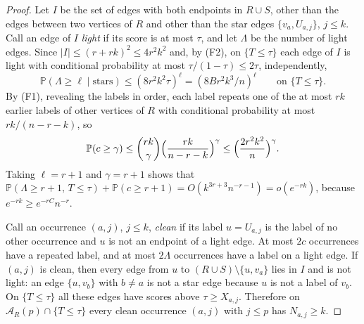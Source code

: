 \documentclass[11pt]{amsart}
\theoremstyle{remark}
\numberwithin{equation}{section}
\newcommand{\Pp}{\mathbb P}
\newcommand{\1}{\mathbf 1}
\begin{document}
\begin{proof}
Let $I$ be the set of edges with both endpoints in $R\cup S$, other than the edges between two vertices of $R$ and other than the star edges $\{v_a,U_{a,j}\}$, $j\le k$. Call an edge of $I$ \emph{light} if its score is at most $\tau$, and let $\Lambda$ be the number of light edges. Since $|I|\le(r+rk)^2\le4r^2k^2$ and, by (F2), on $\{T\le\tau\}$ each edge of $I$ is light with conditional probability at most $\tau/(1-\tau)\le2\tau$, independently,
\begin{equation}\label{eq:light}
\Pp(\Lambda\ge\ell\mid\text{stars})\le(8r^2k^2\tau)^\ell=(8Br^2k^3/n)^\ell\qquad\text{on }\{T\le\tau\}.
\end{equation}
By (F1), revealing the labels in order, each label repeats one of the at most $rk$ earlier labels of other vertices of $R$ with conditional probability at most $rk/(n-r-k)$, so
\begin{equation}\label{eq:coll}
\Pp(c\ge\gamma)\le\binom{rk}\gamma\Bigl(\frac{rk}{n-r-k}\Bigr)^\gamma\le\Bigl(\frac{2r^2k^2}n\Bigr)^\gamma .
\end{equation}
Taking $\ell=r+1$ and $\gamma=r+1$ shows that $\Pp(\Lambda\ge r+1,\,T\le\tau)+\Pp(c\ge r+1)=O(k^{3r+3}n^{-r-1})=o(e^{-rk})$, because $e^{-rk}\ge e^{-rC}n^{-r}$.

Call an occurrence $(a,j)$, $j\le k$, \emph{clean} if its label $u=U_{a,j}$ is the label of no other occurrence and $u$ is not an endpoint of a light edge. At most $2c$ occurrences have a repeated label, and at most $2\Lambda$ occurrences have a label on a light edge. If $(a,j)$ is clean, then every edge from $u$ to $(R\cup S)\setminus\{u,v_a\}$ lies in $I$ and is not light: an edge $\{u,v_b\}$ with $b\ne a$ is not a star edge because $u$ is not a label of $v_b$. On $\{T\le\tau\}$ all these edges have scores above $\tau\ge X_{a,j}$. Therefore on $\mathcal A_R(p)\cap\{T\le\tau\}$ every clean occurrence $(a,j)$ with $j\le p$ has $N_{a,j}\ge k$.


\end{proof}
\end{document}
